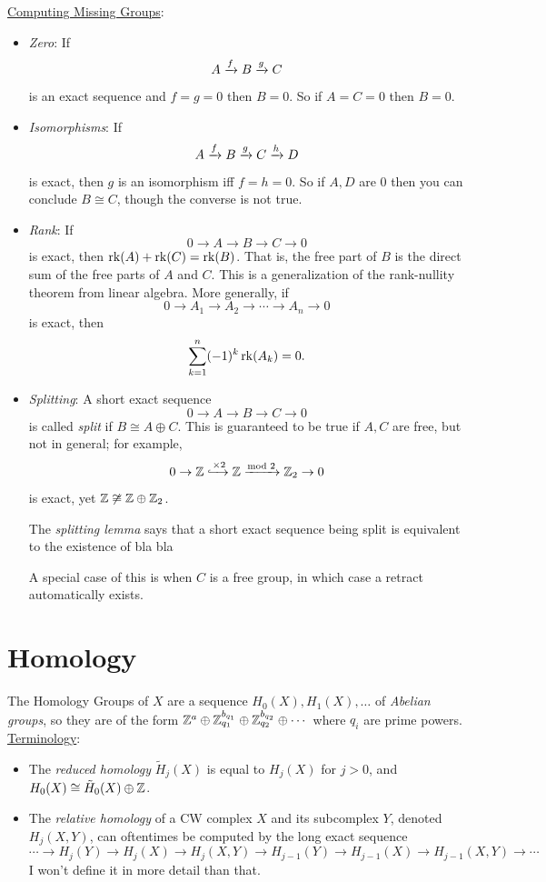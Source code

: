 \documentclass{amsart}
\begin{document}
	\underline{Computing Missing Groups}:
	\begin{itemize}
		\item \textit{Zero}: If 
		$$
		A\xrightarrow{f} B \xrightarrow{g} C
		$$
		is an exact sequence and $f=g=0$ then $B=0$. So if $A=C=0$ then $B=0$.
		\item \textit{Isomorphisms}: If 
		$$
		A\xrightarrow{f} B\xrightarrow{g} C\xrightarrow{h} D
		$$
		is exact, then $g$ is an isomorphism iff $f=h=0$. So if $A,D$ are 0 then you can conclude $B\cong C$, though the converse is not true. 
		\item \textit{Rank}: If
		$$
		0\to A\to B \to C \to 0
		$$
		is exact, then $\operatorname{rk}(A)+\operatorname{rk}(C)=\operatorname{rk}(B)$. That is, the free part of $B$ is the direct sum of the free parts of $A$ and $C$. This is a generalization of the rank-nullity theorem from linear algebra. More generally, if
		$$
		0\to A_1 \to A_2 \to \cdots \to A_n \to 0
		$$
		is exact, then 
		$$
		\sum_{k=1}^n (-1)^k \operatorname{rk}(A_k) = 0.
		$$
		\item \textit{Splitting}: A short exact sequence 
		$$
		0\to A \to B \to C \to 0
		$$
		is called \textit{split} if $B\cong A\oplus C$. This is guaranteed to be true if $A,C$ are free, but not in general; for example,
		$$
		0\to \mathbb{Z}\xhookrightarrow{\times 2} \mathbb{Z} \xrightarrow{\text{mod }2} \mathbb{Z}_2\to 0
		$$
		is exact, yet $\mathbb{Z}\not\cong \mathbb{Z}\oplus \mathbb{Z}_2$.
		
		The \textit{splitting lemma} says that a short exact sequence being split is equivalent to the existence of bla bla 
		
		A special case of this is when $C$ is a free group, in which case a retract automatically exists. 
	\end{itemize}
	
	\newpage
	\section{Homology}
	
	The Homology Groups of $X$ are a sequence $H_0(X),H_1(X),\dots$ of \textit{Abelian groups}, so they are of the form $\mathbb{Z}^a\oplus \mathbb{Z}_{q_1}^{b_{q_1}}\oplus \mathbb{Z}_{q_2}^{b_{q_2}}\oplus \cdots$ where $q_i$ are prime powers. \\
	
	\underline{Terminology}:
	\begin{itemize}
	\item The \textit{reduced homology} $\tilde{H}_j(X)$ is equal to $H_j(X)$ for $j>0$, and $H_0(X) \cong \tilde{H}_0(X) \oplus \mathbb{Z}$.
	\item The \textit{relative homology} of a CW complex $X$ and its subcomplex $Y$, denoted $H_j(X,Y)$, can oftentimes be computed by the long exact sequence
	$$
	\cdots \to H_j(Y)\to H_j(X) \to H_j(X,Y) \to H_{j-1}(Y)\to H_{j-1}(X)\to H_{j-1}(X,Y)\to \cdots 
	$$
	I won't define it in more detail than that.
	\end{itemize}
	
\end{document}
